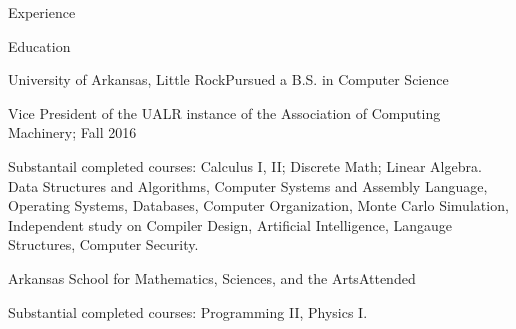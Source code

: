 \documentclass{resume} %
\begin{document}
\begin{rSection}{Experience}
%

\end{rSection}

\clearpage



\begin{rSection}{Education}

\begin{rSubsection}{University of Arkansas, Little Rock}{}{Pursued a B.S. in Computer Science}

	\item Vice President of the UALR instance of the Association of Computing Machinery; Fall 2016
	\item Substantail completed courses: Calculus I, II; Discrete Math; Linear Algebra. Data Structures and Algorithms, Computer Systems and Assembly Language, Operating Systems, Databases, Computer Organization, Monte Carlo Simulation, Independent study on Compiler Design, Artificial Intelligence, Langauge Structures, Computer Security.
\end{rSubsection}

\begin{rSubsection}{Arkansas School for Mathematics, Sciences, and the Arts}{}{Attended}

	\item Substantial completed courses: Programming II, Physics I.
\end{rSubsection}

\end{rSection}
\end{document}

